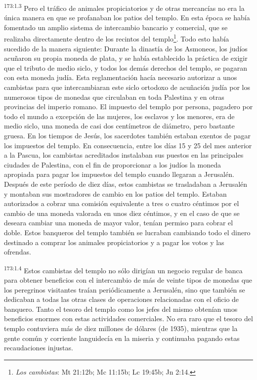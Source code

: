 \par
\textsuperscript{173:1.3} Pero el tráfico de animales propiciatorios y de otras mercancías no era la única manera en que se profanaban los patios del templo. En esta época se había fomentado un amplio sistema de intercambio bancario y comercial, que se realizaba directamente dentro de los recintos del templo\footnote{\textit{Los cambistas}: Mt 21:12b; Mc 11:15b; Lc 19:45b; Jn 2:14.}. Todo esto había sucedido de la manera siguiente: Durante la dinastía de los Asmoneos, los judíos acuñaron su propia moneda de plata, y se había establecido la práctica de exigir que el tributo de medio siclo, y todos los demás derechos del templo, se pagaran con esta moneda judía. Esta reglamentación hacía necesario autorizar a unos cambistas para que intercambiaran este siclo ortodoxo de acuñación judía por los numerosos tipos de monedas que circulaban en toda Palestina y en otras provincias del imperio romano. El impuesto del templo por persona, pagadero por todo el mundo a excepción de las mujeres, los esclavos y los menores, era de medio siclo, una moneda de casi dos centímetros de diámetro, pero bastante gruesa. En los tiempos de Jesús, los sacerdotes también estaban exentos de pagar los impuestos del templo. En consecuencia, entre los días 15 y 25 del mes anterior a la Pascua, los cambistas acreditados instalaban sus puestos en las principales ciudades de Palestina, con el fin de proporcionar a los judíos la moneda apropiada para pagar los impuestos del templo cuando llegaran a Jerusalén. Después de este período de diez días, estos cambistas se trasladaban a Jerusalén y montaban sus mostradores de cambio en los patios del templo. Estaban autorizados a cobrar una comisión equivalente a tres o cuatro céntimos por el cambio de una moneda valorada en unos diez céntimos, y en el caso de que se deseara cambiar una moneda de mayor valor, tenían permiso para cobrar el doble. Estos banqueros del templo también se lucraban cambiando todo el dinero destinado a comprar los animales propiciatorios y a pagar los votos y las ofrendas.

\par
\textsuperscript{173:1.4} Estos cambistas del templo no sólo dirigían un negocio regular de banca para obtener beneficios con el intercambio de más de veinte tipos de monedas que los peregrinos visitantes traían periódicamente a Jerusalén, sino que también se dedicaban a todas las otras clases de operaciones relacionadas con el oficio de banquero. Tanto el tesoro del templo como los jefes del mismo obtenían unos beneficios enormes con estas actividades comerciales. No era raro que el tesoro del templo contuviera más de diez millones de dólares (de 1935), mientras que la gente común y corriente languidecía en la miseria y continuaba pagando estas recaudaciones injustas.

